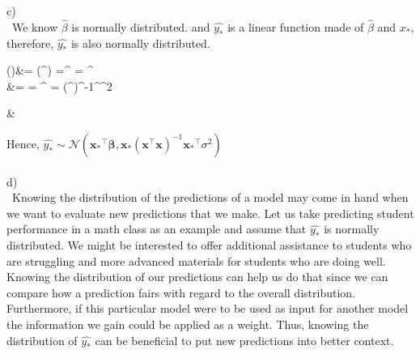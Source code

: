 \documentclass{article}
\newcommand{\Var}{\mathrm{Var}}
\begin{document}
\\
\\
c)\\\
We know $\hat{\beta}$ is normally distributed. and $\hat{y_*}$ is a linear function made of $\hat{\beta}$ and $x_*$, therefore, $\hat{y_*}$ is also normally distributed. 
\begin{flalign*}
\begin{split}
()&= (^\intercal \mathbf{\hat{\beta}})
=^\intercal \mathop{\mathbb{E}(\hat{\beta})}
= \mathbf{x_*}^\intercal \mathbf{\beta}\\
\Var{(\hat{y_*})} &= \Var{(^\intercal \mathbf{\hat{\beta}})} 
=  \Var{\hat{\beta}} \mathbf{x_*}^\intercal 
=\mathbf{x_*} (^\intercal \mathbf{x})^{-1}^\intercal  \sigma ^2
\end{split}&
\end{flalign*}

Hence, $\hat{y_*} \sim \mathcal{N}(\mathbf{x_*}^\intercal \mathbf{\beta},\mathbf{x_*} (\mathbf{x}^\intercal \mathbf{x})^{-1}\mathbf{x_*}^\intercal  \sigma ^2)\ $
\\
\\
d)\\\
Knowing the distribution of the predictions of a model may come in hand when we want to evaluate new predictions that we make. Let us take predicting student performance in a math class as an example and assume that $\hat{y_*}$ is normally distributed. We might be interested to offer additional assistance to students who are struggling and more advanced materials for students who are doing well. Knowing the distribution of our predictions can help us do that since we can compare how a prediction fairs with regard to the overall distribution. Furthermore, if this particular model were to be used as input for another model the information we gain could be applied as a weight. Thus, knowing the distribution of $\hat{y_*}$ can be beneficial to put new predictions into better context.
\end{document}
